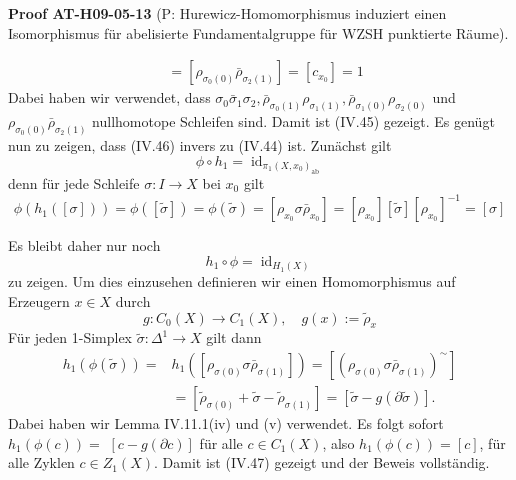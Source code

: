 \documentclass[10pt, letterpaper]{article}
\newcommand{\CustomHeading}[3]{%
  \par\medskip\noindent%
  \textbf{#1 #2} \textnormal{(#3)}.\enskip%
}
\newenvironment{PROOF}[2]{\begin{unitbox}\CustomHeading{Proof}{#1}{#2}}{\end{unitbox}}
\begin{document}
\begin{PROOF}{AT-H09-05-13}{P: Hurewicz-Homomorphismus induziert einen Isomorphismus für abelisierte Fundamentalgruppe für WZSH punktierte Räume}
$$\begin{aligned}
& =\left[\rho_{\sigma_0(0)} \bar{\rho}_{\sigma_2(1)}\right]=\left[c_{x_0}\right]=1
\end{aligned}
$$
Dabei haben wir verwendet, dass $\sigma_0 \bar{\sigma}_1 \sigma_2, \bar{\rho}_{\sigma_0(1)} \rho_{\sigma_1(1)}, \bar{\rho}_{\sigma_1(0)} \rho_{\sigma_2(0)}$ und $\rho_{\sigma_0(0)} \bar{\rho}_{\sigma_2(1)}$ nullhomotope Schleifen sind. Damit ist (IV.45) gezeigt. Es genügt nun zu zeigen, dass (IV.46) invers zu (IV.44) ist. Zunächst gilt
$$
\phi \circ h_1=\operatorname{id}_{\pi_1\left(X, x_0\right)_{\mathrm{ab}}}
$$
denn für jede Schleife $\sigma: I \rightarrow X$ bei $x_0$ gilt
$$
\phi\left(h_1([\sigma])\right)=\phi([\tilde{\sigma}])=\phi(\tilde{\sigma})=\left[\rho_{x_0} \sigma \bar{\rho}_{x_0}\right]=\left[\rho_{x_0}\right][\tilde{\sigma}]\left[\rho_{x_0}\right]^{-1}=[\sigma]
$$

Es bleibt daher nur noch
$$
h_1 \circ \phi=\operatorname{id}_{H_1(X)}
$$
zu zeigen. Um dies einzusehen definieren wir einen Homomorphismus auf Erzeugern $x \in X$ durch
$$
g: C_0(X) \rightarrow C_1(X), \quad g(x):=\tilde{\rho}_x
$$
Für jeden 1-Simplex $\tilde{\sigma}: \Delta^1 \rightarrow X$ gilt dann
$$
\begin{aligned}
h_1(\phi(\tilde{\sigma}))= & h_1\left(\left[\rho_{\sigma(0)} \sigma \bar{\rho}_{\sigma(1)}\right]\right)=\left[\left(\rho_{\sigma(0)} \sigma \bar{\rho}_{\sigma(1)}\right)^{\sim}\right] \\
& =\left[\tilde{\rho}_{\sigma(0)}+\tilde{\sigma}-\tilde{\rho}_{\sigma(1)}\right]=[\tilde{\sigma}-g(\partial \tilde{\sigma})] .
\end{aligned}
$$
Dabei haben wir Lemma IV.11.1(iv) und (v) verwendet. Es folgt sofort $h_1(\phi(c))=$ $[c-g(\partial c)]$ für alle $c \in C_1(X)$, also $h_1(\phi(c))=[c]$, für alle Zyklen $c \in Z_1(X)$. Damit ist (IV.47) gezeigt und der Beweis vollständig.
\end{PROOF}








\pagebreak
\printbibliography
\end{document}

